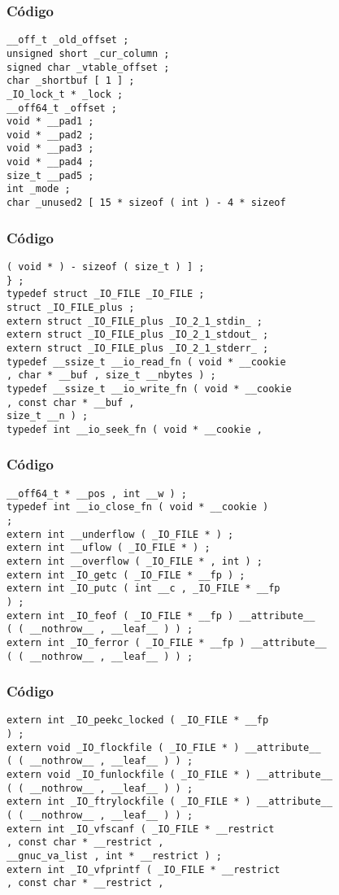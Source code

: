 \documentclass{beamer}
\begin{document}
\begin{frame}[fragile]
\frametitle{C\'odigo}
\begin{verbatim}
__off_t _old_offset ; 
unsigned short _cur_column ; 
signed char _vtable_offset ; 
char _shortbuf [ 1 ] ; 
_IO_lock_t * _lock ; 
__off64_t _offset ; 
void * __pad1 ; 
void * __pad2 ; 
void * __pad3 ; 
void * __pad4 ; 
size_t __pad5 ; 
int _mode ; 
char _unused2 [ 15 * sizeof ( int ) - 4 * sizeof 
\end{verbatim}
\end{frame}
\begin{frame}[fragile]
\frametitle{C\'odigo}
\begin{verbatim}
( void * ) - sizeof ( size_t ) ] ; 
} ; 
typedef struct _IO_FILE _IO_FILE ; 
struct _IO_FILE_plus ; 
extern struct _IO_FILE_plus _IO_2_1_stdin_ ; 
extern struct _IO_FILE_plus _IO_2_1_stdout_ ; 
extern struct _IO_FILE_plus _IO_2_1_stderr_ ; 
typedef __ssize_t __io_read_fn ( void * __cookie 
, char * __buf , size_t __nbytes ) ; 
typedef __ssize_t __io_write_fn ( void * __cookie 
, const char * __buf , 
size_t __n ) ; 
typedef int __io_seek_fn ( void * __cookie , 
\end{verbatim}
\end{frame}
\begin{frame}[fragile]
\frametitle{C\'odigo}
\begin{verbatim}
__off64_t * __pos , int __w ) ; 
typedef int __io_close_fn ( void * __cookie ) 
; 
extern int __underflow ( _IO_FILE * ) ; 
extern int __uflow ( _IO_FILE * ) ; 
extern int __overflow ( _IO_FILE * , int ) ; 
extern int _IO_getc ( _IO_FILE * __fp ) ; 
extern int _IO_putc ( int __c , _IO_FILE * __fp 
) ; 
extern int _IO_feof ( _IO_FILE * __fp ) __attribute__ 
( ( __nothrow__ , __leaf__ ) ) ; 
extern int _IO_ferror ( _IO_FILE * __fp ) __attribute__ 
( ( __nothrow__ , __leaf__ ) ) ; 
\end{verbatim}
\end{frame}
\begin{frame}[fragile]
\frametitle{C\'odigo}
\begin{verbatim}
extern int _IO_peekc_locked ( _IO_FILE * __fp 
) ; 
extern void _IO_flockfile ( _IO_FILE * ) __attribute__ 
( ( __nothrow__ , __leaf__ ) ) ; 
extern void _IO_funlockfile ( _IO_FILE * ) __attribute__ 
( ( __nothrow__ , __leaf__ ) ) ; 
extern int _IO_ftrylockfile ( _IO_FILE * ) __attribute__ 
( ( __nothrow__ , __leaf__ ) ) ; 
extern int _IO_vfscanf ( _IO_FILE * __restrict 
, const char * __restrict , 
__gnuc_va_list , int * __restrict ) ; 
extern int _IO_vfprintf ( _IO_FILE * __restrict 
, const char * __restrict , 
\end{verbatim}
\end{frame}
\end{document}
